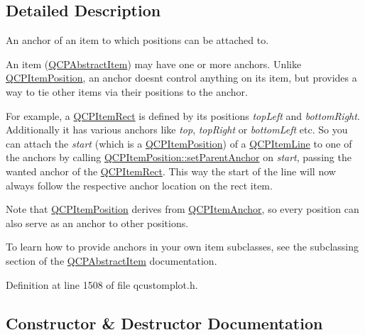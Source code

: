 \subsection{Detailed Description}
An anchor of an item to which positions can be attached to. 

An item (\hyperlink{class_q_c_p_abstract_item}{Q\+C\+P\+Abstract\+Item}) may have one or more anchors. Unlike \hyperlink{class_q_c_p_item_position}{Q\+C\+P\+Item\+Position}, an anchor doesn\textquotesingle{}t control anything on its item, but provides a way to tie other items via their positions to the anchor.

For example, a \hyperlink{class_q_c_p_item_rect}{Q\+C\+P\+Item\+Rect} is defined by its positions {\itshape top\+Left} and {\itshape bottom\+Right}. Additionally it has various anchors like {\itshape top}, {\itshape top\+Right} or {\itshape bottom\+Left} etc. So you can attach the {\itshape start} (which is a \hyperlink{class_q_c_p_item_position}{Q\+C\+P\+Item\+Position}) of a \hyperlink{class_q_c_p_item_line}{Q\+C\+P\+Item\+Line} to one of the anchors by calling \hyperlink{class_q_c_p_item_position_ac094d67a95d2dceafa0d50b9db3a7e51}{Q\+C\+P\+Item\+Position\+::set\+Parent\+Anchor} on {\itshape start}, passing the wanted anchor of the \hyperlink{class_q_c_p_item_rect}{Q\+C\+P\+Item\+Rect}. This way the start of the line will now always follow the respective anchor location on the rect item.

Note that \hyperlink{class_q_c_p_item_position}{Q\+C\+P\+Item\+Position} derives from \hyperlink{class_q_c_p_item_anchor}{Q\+C\+P\+Item\+Anchor}, so every position can also serve as an anchor to other positions.

To learn how to provide anchors in your own item subclasses, see the subclassing section of the \hyperlink{class_q_c_p_abstract_item}{Q\+C\+P\+Abstract\+Item} documentation. 

Definition at line 1508 of file qcustomplot.\+h.



\subsection{Constructor \& Destructor Documentation}

